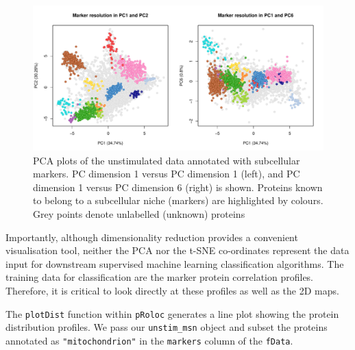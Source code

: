 \documentclass[9pt,a4paper,]{extarticle}
\newenvironment{Shaded}{\begin{snugshade}}{\end{snugshade}}
\newcommand{\AttributeTok}[1]{\textcolor[rgb]{0.13,0.29,0.53}{#1}}
\newcommand{\DecValTok}[1]{\textcolor[rgb]{0.00,0.00,0.81}{#1}}
\newcommand{\DocumentationTok}[1]{\textcolor[rgb]{0.56,0.35,0.01}{\textbf{\textit{#1}}}}
\newcommand{\FunctionTok}[1]{\textcolor[rgb]{0.13,0.29,0.53}{\textbf{#1}}}
\newcommand{\NormalTok}[1]{#1}
\newcommand{\OtherTok}[1]{\textcolor[rgb]{0.56,0.35,0.01}{#1}}
\newcommand{\SpecialCharTok}[1]{\textcolor[rgb]{0.81,0.36,0.00}{\textbf{#1}}}
\newcommand{\StringTok}[1]{\textcolor[rgb]{0.31,0.60,0.02}{#1}}
\begin{document}
\begin{figure}[H]

{\centering \includegraphics[width=0.9\linewidth,]{figs/diff_pc_maps} 

}

\caption{PCA plots of the unstimulated data annotated with subcellular markers. PC dimension 1 versus PC dimension 1 (left), and PC dimension 1 versus PC dimension 6 (right) is shown. Proteins known to belong to a subcellular niche (markers) are highlighted by colours. Grey points denote unlabelled (unknown) proteins}\label{fig:diff-pcas-fig}
\end{figure}

Importantly, although dimensionality reduction provides a convenient visualisation
tool, neither the PCA nor the t-SNE co-ordinates represent the data input for
downstream supervised machine learning classification algorithms. The training
data for classification are the marker protein correlation profiles. Therefore,
it is critical to look directly at these profiles as well as the 2D maps.

The \texttt{plotDist} function within \texttt{pRoloc} generates a line plot showing the protein
distribution profiles. We pass our \texttt{unstim\_msn} object and subset the proteins
annotated as \texttt{"mitochondrion"} in the \texttt{markers} column of the \texttt{fData}.

\begin{Shaded}
\end{Shaded}
\end{document}
